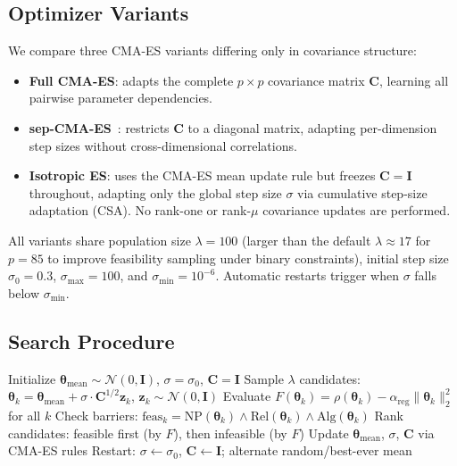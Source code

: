\documentclass[twoside,11pt]{article}
\newcommand{\btheta}{\boldsymbol{\theta}}
\newcommand{\bC}{\mathbf{C}}
\newcommand{\bI}{\mathbf{I}}
\begin{document}
\subsection{Optimizer Variants}

We compare three CMA-ES variants differing only in covariance structure:

\begin{itemize}
\item \textbf{Full CMA-ES}: adapts the complete $p \times p$ covariance matrix
  $\bC$, learning all pairwise parameter dependencies.
\item \textbf{sep-CMA-ES}~\citep{ros2008simple}: restricts $\bC$ to a diagonal
  matrix, adapting per-dimension step sizes without cross-dimensional correlations.
\item \textbf{Isotropic ES}: uses the CMA-ES mean update rule but freezes
  $\bC = \bI$ throughout, adapting only the global step size $\sigma$ via
  cumulative step-size adaptation (CSA). No rank-one or rank-$\mu$ covariance
  updates are performed.
\end{itemize}

All variants share population size $\lambda = 100$ (larger than the default
$\lambda \approx 17$ for $p = 85$ to improve feasibility sampling under binary
constraints), initial step size $\sigma_0 = 0.3$, $\sigma_{\max} = 100$, and
$\sigma_{\min} = 10^{-6}$. Automatic restarts trigger when $\sigma$ falls below
$\sigma_{\min}$.

\subsection{Search Procedure}

\begin{algorithm}[t]
\caption{Barrier-constrained CMA-ES search}
\label{alg:search}
\begin{algorithmic}[1]
\STATE Initialize $\btheta_{\text{mean}} \sim \mathcal{N}(0, \bI)$, $\sigma = \sigma_0$, $\bC = \bI$
  \STATE Sample $\lambda$ candidates: $\btheta_k = \btheta_{\text{mean}} + \sigma \cdot \bC^{1/2} \mathbf{z}_k$, $\mathbf{z}_k \sim \mathcal{N}(0, \bI)$
  \STATE Evaluate $F(\btheta_k) = \rho(\btheta_k) - \alpha_{\text{reg}}\|\btheta_k\|_2^2$ for all $k$
  \STATE Check barriers: $\text{feas}_k = \text{NP}(\btheta_k) \wedge \text{Rel}(\btheta_k) \wedge \text{Alg}(\btheta_k)$
  \STATE Rank candidates: feasible first (by $F$), then infeasible (by $F$)
  \STATE Update $\btheta_{\text{mean}}$, $\sigma$, $\bC$ via CMA-ES rules
  \IF{$\sigma < \sigma_{\min}$}
    \STATE Restart: $\sigma \gets \sigma_0$, $\bC \gets \bI$; alternate random/best-ever mean
  \ENDIF
\ENDFOR
\end{algorithmic}
\end{algorithm}
\end{document}
